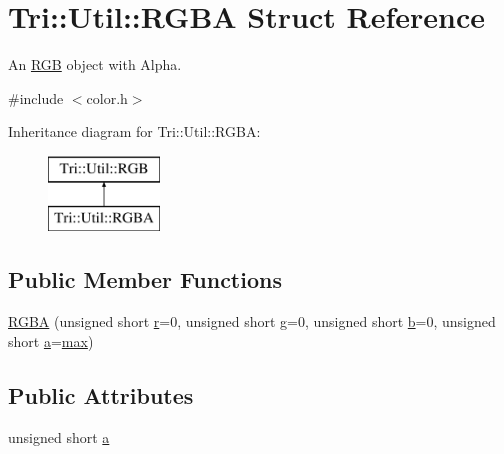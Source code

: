 \hypertarget{struct_tri_1_1_util_1_1_r_g_b_a}{}\section{Tri\+:\+:Util\+:\+:R\+G\+B\+A Struct Reference}
\label{struct_tri_1_1_util_1_1_r_g_b_a}


An \hyperlink{struct_tri_1_1_util_1_1_r_g_b}{R\+G\+B} object with Alpha.  




{\ttfamily \#include $<$color.\+h$>$}

Inheritance diagram for Tri\+:\+:Util\+:\+:R\+G\+B\+A\+:\begin{figure}[H]
\begin{center}
\leavevmode
\includegraphics[height=2.000000cm]{struct_tri_1_1_util_1_1_r_g_b_a}
\end{center}
\end{figure}
\subsection*{Public Member Functions}
\begin{DoxyCompactItemize}
\item 
\hyperlink{group__lus__color_ga176185fd28695a28700ed4c5fdb48767}{R\+G\+B\+A} (unsigned short \hyperlink{group__lus__color_gab1905470bfa9e2bd85fcc53b45e6587c}{r}=0, unsigned short \hyperlink{group__lus__color_ga0feb7cf657a0256c05aa23257ff38b38}{g}=0, unsigned short \hyperlink{group__lus__color_gaa434512797df3728a5cb66c4ee2aab65}{b}=0, unsigned short \hyperlink{group__lus__color_ga2e320ee0bdb81d7661a31b2f615e9fea}{a}=\hyperlink{group__lus__color_ga45ab730fe9bc39935d679e4a65a55292}{max})
\end{DoxyCompactItemize}
\subsection*{Public Attributes}
\begin{DoxyCompactItemize}
\item 
unsigned short \hyperlink{group__lus__color_ga2e320ee0bdb81d7661a31b2f615e9fea}{a}
\end{DoxyCompactItemize}


